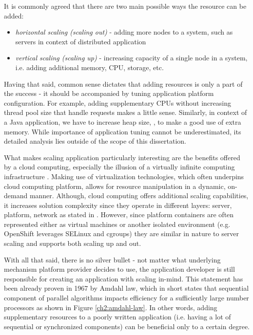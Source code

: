 It is commonly agreed that there are two main possible ways the resource can be added:
\begin{itemize}
	\item \textit{horizontal scaling (scaling out)} - adding more nodes to a system, such as servers in context of distributed application
	\item \textit{vertical scaling (scaling up)} - increasing capacity of a single node in a system, i.e. adding additional memory, CPU, storage, etc.
\end{itemize}

Having that said, common sense dictates that adding resources is only a part of the success - it should be accompanied by tuning application platform configuration. For example, adding supplementary CPUs without increasing thread pool size that handle requests makes a little sense. Similarly, in context of a Java application, we have to increase heap size, , to make a good use of extra memory. While importance of application tuning cannot be underestimated, its detailed analysis lies outside of the scope of this dissertation.

What makes scaling application particularly interesting are the benefits offered by a cloud computing, especially the illusion of a virtually infinite computing infrastructure \cite{VaRoBu11}. Making use of virtualization technologies, which often underpins cloud computing platform, allows for resource manipulation in a dynamic, on-demand manner. Although, cloud computing offers additional scaling capabilities, it increases solution complexity since they operate in different layers: server, platform, network as stated in \cite{VaRoBu11}. However, since platform containers are often represented either as virtual machines or another isolated environment (e.g. OpenShift leverages SELinux and cgroups) they are similar in nature to server scaling and supports both scaling up and out.

With all that said, there is no silver bullet - not matter what underlying mechanism platform provider decides to use, the application developer is still responsible for creating an application with scaling in-mind. This statement has been already proven in 1967 by Amdahl law, which in short states that sequential component of parallel algorithms impacts efficiency for a sufficiently large number processors \cite{Am67} as shown in Figure \ref{ch2:amdahl-law}. In other words, adding supplementary resources to a poorly written application (i.e. having a lot of sequential or synchronized components) can be beneficial only to a certain degree.

